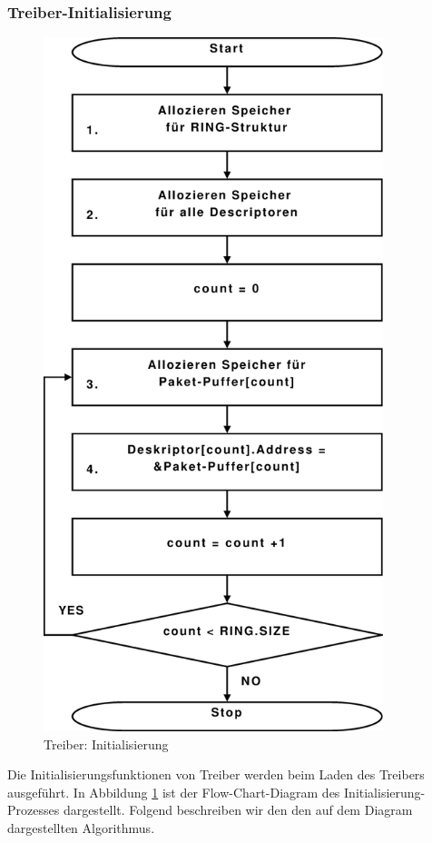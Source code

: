 \subsubsection*{Treiber-Initialisierung} 
\begin{figure}
\centering 
\includegraphics[width=3.9in]{bilder/FlowChart_Treiber_Init}
\caption{Treiber: Initialisierung}
\label{img:new_treiber_init}
\end{figure}
Die Initialisierungsfunktionen von Treiber werden beim Laden des Treibers
ausgeführt.  In Abbildung \ref{img:new_treiber_init} ist der Flow-Chart-Diagram
des Initialisierung-Prozesses dargestellt. Folgend beschreiben wir den den auf
dem Diagram dargestellten Algorithmus.
